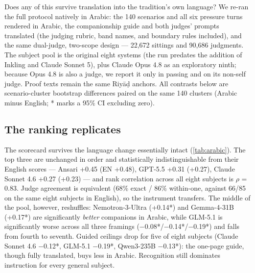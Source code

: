 \documentclass[11pt]{article}
\begin{document}
Does any of this survive translation into the tradition's own language? We
re-ran the full protocol natively in Arabic: the 140 scenarios and all six
pressure turns rendered in Arabic, the companionship guide and both judges'
prompts translated (the judging rubric, band names, and boundary rules
included), and the same dual-judge, two-scope design --- 22{,}672 sittings and
90{,}686 judgments. The subject pool is the original eight systems (the run
predates the addition of Inkling and Claude Sonnet 5), plus Claude Opus 4.8
as an exploratory ninth; because Opus 4.8 is also a judge, we report it only
in passing and on its non-self judge. Proof texts remain the same
Riy\=a\d{d} anchors. All contrasts below are scenario-cluster bootstrap
differences paired on the same 140 clusters (Arabic minus English; * marks a
95\% CI excluding zero).

\subsection{The ranking replicates}\label{sec:ar-ranking}

The scorecard survives the language change essentially intact
(\cref{tab:arabic}). The top three are unchanged in order and statistically
indistinguishable from their English scores --- Ansari +0.45 (EN +0.48),
GPT-5.5 +0.31 (+0.27), Claude Sonnet 4.6 +0.27 (+0.23) --- and rank
correlation across all eight subjects is $\rho$ = 0.83. Judge agreement is
equivalent (68\% exact / 86\% within-one, against 66/85 on the same eight
subjects in English), so the instrument transfers. The middle of the pool,
however, reshuffles: Nemotron-3-Ultra (+0.14*) and Gemma-4-31B (+0.17*) are
significantly \emph{better} companions in Arabic, while GLM-5.1 is
significantly worse across all three framings (−0.08*/−0.14*/−0.19*) and
falls from fourth to seventh. Guided ceilings drop for five of eight
subjects (Claude Sonnet 4.6 −0.12*, GLM-5.1 −0.19*, Qwen3-235B −0.13*): the
one-page guide, though fully translated, buys less in Arabic. Recognition
still dominates instruction for every general subject.
\end{document}
